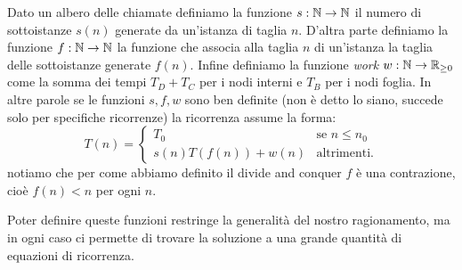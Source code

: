 \documentclass[11pt]{scrartcl}
\begin{document}
	\begin{definition}[funzioni $s,f,w$]
		Dato un albero delle chiamate definiamo la funzione $s:\mathbb N\to\mathbb N$ il numero di sottoistanze  $s(n)$ generate da un'istanza di taglia $n$. D'altra parte definiamo la funzione $f:\mathbb N\to\mathbb N $ la funzione che associa alla taglia $n$ di un'istanza la taglia delle sottoistanze generate $f(n)$. Infine definiamo la funzione \textit{work} $w:\mathbb N \to \mathbb R_{\ge 0}$ come la somma dei tempi $T_D+T_C$ per i nodi interni e $T_B$ per i nodi foglia. In altre parole se le funzioni $s,f,w$ sono ben definite (non è detto lo siano, succede solo per specifiche ricorrenze) la ricorrenza assume la forma:
		$$
		T(n)=
		\begin{cases}
			T_0 & \text{se $n\le n_0$} \\
			s(n)T(f(n))+w(n) & \text{altrimenti.}
		\end{cases}
		$$
		notiamo che per come abbiamo definito il divide and conquer $f$ è una contrazione, cioè $f(n)<n$ per ogni $n$. 
	\end{definition}
	Poter definire queste funzioni restringe la generalità del nostro ragionamento, ma in ogni caso ci permette di trovare la soluzione a una grande quantità di equazioni di ricorrenza.
	
\end{document}
